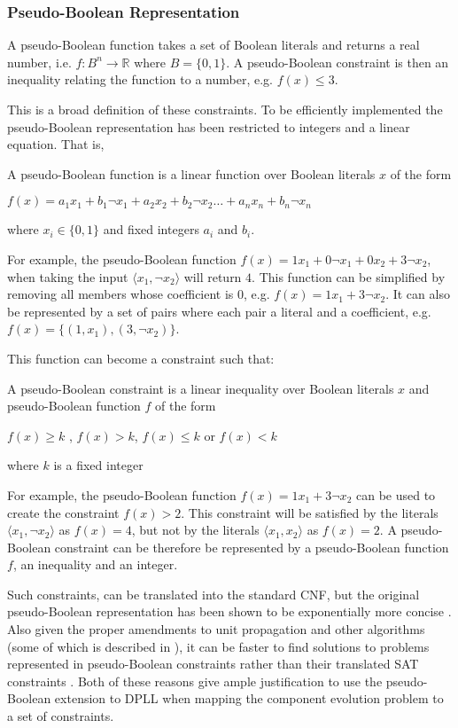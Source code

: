 \subsubsection{Pseudo-Boolean Representation}
A pseudo-Boolean function takes a set of Boolean literals and returns a real number, i.e. $f:B^n \rightarrow \mathbb{R}$ where $B = \{0,1\}$.
A pseudo-Boolean constraint is then an inequality relating the function to a number, e.g. $f(x) \leq 3$.

This is a broad definition of these constraints.
To be efficiently implemented the pseudo-Boolean representation has been restricted to integers and a linear equation.
That is,
\begin{defs}
A pseudo-Boolean function is a linear function over Boolean literals $x$ of the form

$f(x) = a_1x_1 + b_1\neg x_1 + a_2x_2 + b_2\neg x_2 \ldots +  a_nx_n + b_n\neg x_n$

where $x_i \in \{0,1\}$ and fixed integers $a_i$ and $b_i$.
\end{defs}
For example, the pseudo-Boolean function $f(x) = 1x_1 + 0\neg x_1 + 0x_2 + 3\neg x_2$, when taking the input $\langle x_1, \neg x_2 \rangle$ will return $4$.
This function can be simplified by removing all members whose coefficient is $0$, e.g. $f(x) = 1x_1 + 3\neg x_2$.
It can also be represented by a set of pairs where each pair a literal and a coefficient, e.g. $f(x) = \{ (1,x_1), (3,\neg x_2) \}$.

This function can become a constraint such that:
\begin{defs}
A pseudo-Boolean constraint is a linear inequality over Boolean literals $x$ and pseudo-Boolean function $f$ of the form

$f(x) \geq k$ , $f(x) > k$, $f(x) \leq k$ or $f(x) < k$

where $k$ is a fixed integer
\end{defs}

For example, the pseudo-Boolean function $f(x) = 1x_1 + 3\neg x_2$ can be used to create the constraint $f(x) > 2$.
This constraint will be satisfied by the literals $\langle x_1, \neg x_2 \rangle$ as $f(x) = 4$, but not by the literals $\langle x_1,  x_2 \rangle$ as $f(x) = 2$.
A pseudo-Boolean constraint can be therefore be represented by a pseudo-Boolean function $f$, an inequality and an integer.

Such constraints, can be translated into the standard CNF, but the original pseudo-Boolean representation has been shown to be exponentially more concise \citep{dixon2004automating}.
Also given the proper amendments to unit propagation and other algorithms (some of which is described in \citep{Sheini2006}), 
it can be faster to find solutions to problems represented in pseudo-Boolean constraints rather than their translated SAT constraints \citep{dixon2004automating}.
Both of these reasons give ample justification to use the pseudo-Boolean extension to DPLL when mapping the component evolution problem to a set of constraints. 

